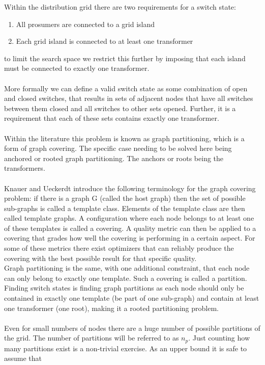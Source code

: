 Within the distribution grid there are two requirements for a switch
state:

\begin{enumerate}
    \item All prosumers are connected to a grid island
    \item Each grid island is connected to at least one transformer
\end{enumerate}

to limit the search space we restrict this further by imposing that each
island must be connected to exactly one transformer.\\
\\
More formally we can define a valid switch state
as some combination of open and closed switches,
that results in sets of adjacent nodes that have all switches
between them closed and all switches to other
sets opened. Further, it is a requirement that each of
these sets contains exactly one transformer.\\
\\
Within the literature this problem is known as graph partitioning, which is a form
of graph covering. 
The specific case needing to be solved here being anchored or 
rooted graph partitioning\autocite{graph_partitioning}. The anchors
or roots being the transformers.\\
\\
Knauer and Ueckerdt\autocite{graph_covering_terminology}
introduce the following terminology for the graph covering problem:
if there is a graph G (called
the host graph) then the set of possible sub-graphs is called a template class.
Elements of the template class are then called template graphs. A configuration 
where each node belongs to at least
one of these templates is called a covering. A quality metric can then be applied to a covering
that grades how well the covering is performing in a certain aspect. For some of these metrics
there exist optimizers that can reliably produce the covering with the best possible result for that
specific quality.\\
Graph partitioning is the same, with one additional constraint, that each node can only belong
to exactly one template. Such a covering is called a partition.\\
Finding switch states is finding graph partitions as each node should only
be contained in exactly one template (be part of one sub-graph) and contain at least
one transformer (one root), making it a rooted partitioning problem.\\
\\
Even for small numbers of nodes there are a huge number of possible partitions
of the grid.
The number of partitions will be referred to as $n_p$.
Just counting how many partitions exist is a non-trivial exercise.
As an upper bound it is safe
to assume that

